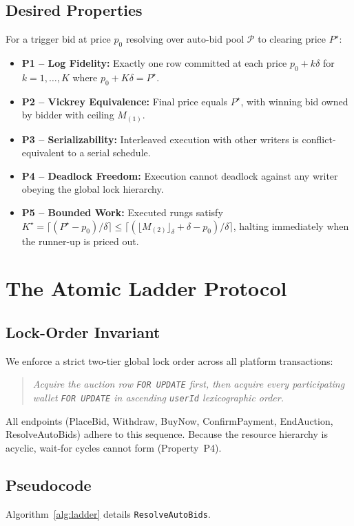 \documentclass[conference]{IEEEtran}
\begin{document}
\subsection{Desired Properties}
For a trigger bid at price $p_0$ resolving over auto-bid pool $\mathcal{P}$ to clearing price $P^\star$:
\begin{itemize}
  \item \textbf{P1 -- Log Fidelity:} Exactly one row committed at each price $p_0 + k\delta$
    for $k = 1, \ldots, K$ where $p_0 + K\delta = P^\star$.
  \item \textbf{P2 -- Vickrey Equivalence:} Final price equals $P^\star$, with winning bid
    owned by bidder with ceiling $M_{(1)}$.
  \item \textbf{P3 -- Serializability:} Interleaved execution with other writers is conflict-equivalent
    to a serial schedule.
  \item \textbf{P4 -- Deadlock Freedom:} Execution cannot deadlock against any writer obeying
    the global lock hierarchy.
  \item \textbf{P5 -- Bounded Work:} Executed rungs satisfy $K^\star = \lceil (P^\star - p_0)/\delta \rceil \leq \lceil (\lfloor M_{(2)} \rfloor_\delta + \delta - p_0)/\delta \rceil$, halting immediately when the runner-up is priced out.
\end{itemize}

\section{The Atomic Ladder Protocol}

\subsection{Lock-Order Invariant}
We enforce a strict two-tier global lock order across all platform transactions:
\begin{quote}
\emph{Acquire the auction row \texttt{FOR UPDATE} first, then acquire every participating
wallet \texttt{FOR UPDATE} in ascending \texttt{userId} lexicographic order.}
\end{quote}
All endpoints (PlaceBid, Withdraw, BuyNow, ConfirmPayment, EndAuction, ResolveAutoBids)
adhere to this sequence. Because the resource hierarchy is acyclic, wait-for cycles
cannot form (Property~P4).

\subsection{Pseudocode}
Algorithm~\ref{alg:ladder} details \texttt{ResolveAutoBids}.
\end{document}
